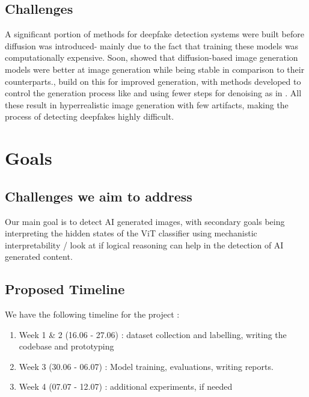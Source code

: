 \documentclass[10pt,twocolumn,letterpaper]{article}
\begin{document}
\subsection{Challenges}
A significant portion of methods for deepfake detection systems were built before diffusion \cite{hoDenoisingDiffusionProbabilistic2020} was introduced- mainly due to the fact that training these models was computationally expensive. Soon, \cite{dhariwalDiffusionModelsBeat2021} showed that diffusion-based image generation models were better at image generation while being stable in comparison to their counterparts.\cite{rombachHighResolutionImageSynthesis2022}, \cite{lipmanFlowMatchingGenerative2023} build on this for improved generation, with methods developed to control the generation process like \cite{ruizDreamBoothFineTuning2023, zhangAddingConditionalControl2023} and using fewer steps for denoising as in \cite{lipmanFlowMatchingGenerative2023}. All these result in hyperrealistic image generation with few artifacts, making the process of detecting deepfakes highly difficult. 


\section{Goals}

\subsection{Challenges we aim to address}

Our main goal is to detect AI generated images, with secondary goals being interpreting the hidden states of the ViT classifier using mechanistic interpretability / look at if logical reasoning can help in the detection of AI generated content.

\subsection{Proposed Timeline}
We have the following timeline for the project :
\begin{enumerate}
	\item Week 1 \& 2 (16.06 - 27.06) : dataset collection and labelling, writing the codebase and prototyping
	\item Week 3 (30.06 - 06.07) : Model training, evaluations, writing reports.
	\item Week 4 (07.07 - 12.07) : additional experiments, if needed
\end{enumerate}
\end{document}
